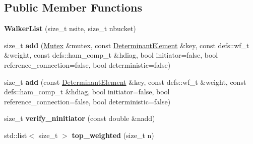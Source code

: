 \subsection*{Public Member Functions}
\begin{DoxyCompactItemize}
\item 
{\bfseries Walker\+List} (size\+\_\+t nsite, size\+\_\+t nbucket)\hypertarget{structWalkerList_aa8cb7220f0d8a5bf4167828670f02791}{}\label{structWalkerList_aa8cb7220f0d8a5bf4167828670f02791}

\item 
size\+\_\+t {\bfseries add} (\hyperlink{classMutex}{Mutex} \&mutex, const \hyperlink{classDeterminantElement}{Determinant\+Element} \&key, const defs\+::wf\+\_\+t \&weight, const defs\+::ham\+\_\+comp\+\_\+t \&hdiag, bool initiator=false, bool reference\+\_\+connection=false, bool deterministic=false)\hypertarget{structWalkerList_a7f662e9bcb96562ab6b2b1ecef93d55d}{}\label{structWalkerList_a7f662e9bcb96562ab6b2b1ecef93d55d}

\item 
size\+\_\+t {\bfseries add} (const \hyperlink{classDeterminantElement}{Determinant\+Element} \&key, const defs\+::wf\+\_\+t \&weight, const defs\+::ham\+\_\+comp\+\_\+t \&hdiag, bool initiator=false, bool reference\+\_\+connection=false, bool deterministic=false)\hypertarget{structWalkerList_a9b1b3dcff0a796f652630575c96f85f2}{}\label{structWalkerList_a9b1b3dcff0a796f652630575c96f85f2}

\item 
size\+\_\+t {\bfseries verify\+\_\+ninitiator} (const double \&nadd)\hypertarget{structWalkerList_a6ca9160362db9d5ae9e8de90e465459f}{}\label{structWalkerList_a6ca9160362db9d5ae9e8de90e465459f}

\item 
std\+::list$<$ size\+\_\+t $>$ {\bfseries top\+\_\+weighted} (size\+\_\+t n)\hypertarget{structWalkerList_a0f29c4bb03f4dbee1321bd8692bc87a0}{}\label{structWalkerList_a0f29c4bb03f4dbee1321bd8692bc87a0}

\end{DoxyCompactItemize}
